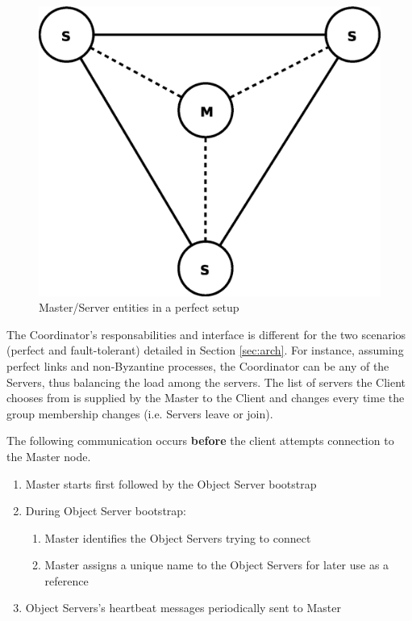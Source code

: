 \documentclass[times, 10pt,twocolumn]{article}
\begin{document}
\begin{figure}
\centering
\includegraphics[scale=0.3]{perfect.eps}
\caption{Master/Server entities in a perfect setup}
\label{fig:perf}
\end{figure}

\label{subsec:recov}

\label{subsec:respon}

The Coordinator's responsabilities and interface is different for the two scenarios (perfect and fault-tolerant) detailed in Section \ref{sec:arch}. For instance, assuming perfect links and non-Byzantine processes, the Coordinator can be any of the Servers, thus balancing the load among the servers. The list of servers the Client chooses from is supplied by the Master to the Client and changes every time the group membership changes (i.e. Servers leave or join). 

\label{sec:algor}

The following communication occurs {\bf before} the client attempts connection 
to the Master node.
\begin{enumerate}
\item Master starts first followed by the Object Server bootstrap
\item During Object Server bootstrap:
\begin{enumerate}
\item Master identifies the Object Servers trying to connect
\item Master assigns a unique name to the Object Servers for later use as a reference
\end{enumerate}
\item Object Servers's heartbeat messages periodically sent to Master
\end{enumerate}
\end{document}
